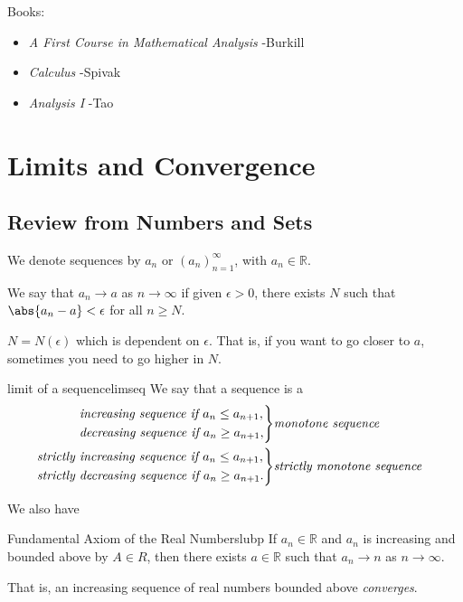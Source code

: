Books:
\begin{itemize}
    \item \textit{A First Course in Mathematical Analysis} -Burkill
    \item \textit{Calculus} -Spivak
    \item \textit{Analysis I} -Tao
\end{itemize}
\section{Limits and Convergence}
\subsection{Review from Numbers and Sets}
\begin{notation}
    We denote sequences by \(a_n\) or \((a_n)^\infty_{n=1}\), with \(a_n \in \mathbb{R}\).
\end{notation}
\begin{definition}{}{}
    We say that \(a_n \to a\) as \(n \to \infty\) if given \(\epsilon > 0\), there exists \(N\) such that \(\abs{a_{n}-a} < \epsilon \) for all \(n \geq N\).
\end{definition}
\begin{note}
    \(N = N(\epsilon)\) which is dependent on \(\epsilon\). That is, if you want to go closer to \(a\), sometimes you need to go higher in \(N\).
\end{note}
\begin{definition}{limit of a sequence}{limseq}
    We say that a sequence is a
    \begin{align*}
        \begin{rcases}
            \textit{increasing sequence if }a_n \leq a_{n+1},\\
            \textit{decreasing sequence if } a_n \geq a_{n+1},
        \end{rcases}&\textit{monotone sequence}\\
        \begin{rcases}
            \textit{strictly increasing sequence if }a_n \leq a_{n+1},\\
            \textit{strictly decreasing sequence if } a_n \geq a_{n+1}.
        \end{rcases}&\textit{strictly monotone sequence}
    \end{align*}
\end{definition}
We also have
\begin{theorem}{Fundamental Axiom of the Real Numbers}{lubp}
    If \(a_n \in \mathbb{R}\) and \(a_n\) is increasing and bounded above by \(A \in R\), then there exists \(a \in \mathbb{R}\) such that \(a_n \to n\) as \(n \to \infty \).

    That is, an increasing sequence of real numbers bounded above \textit{converges}.
\end{theorem}
